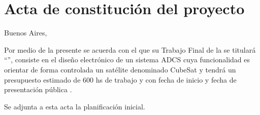 \documentclass[
11pt, %
]{charter}
\begin{document}
\pagebreak



\section*{Acta de constitución del proyecto}
\label{sec:acta}

\begin{flushright}
Buenos Aires, \fechaInicioName
\end{flushright}

\vspace{2cm}

Por medio de la presente se acuerda con el \authorname\hspace{1px} que su Trabajo Final de la \degreename\hspace{1px} se titulará ``\ttitle'', consiste  en el diseño electrónico de un sistema ADCS cuya funcionalidad es orientar de forma controlada un satélite denominado CubeSat y tendrá un presupuesto estimado de 600 hs de trabajo y
con fecha de inicio \fechaInicioName\hspace{1px} y fecha de presentación pública \fechaFinalName.

Se adjunta a esta acta la planificación inicial.

\vfill
\end{document}
